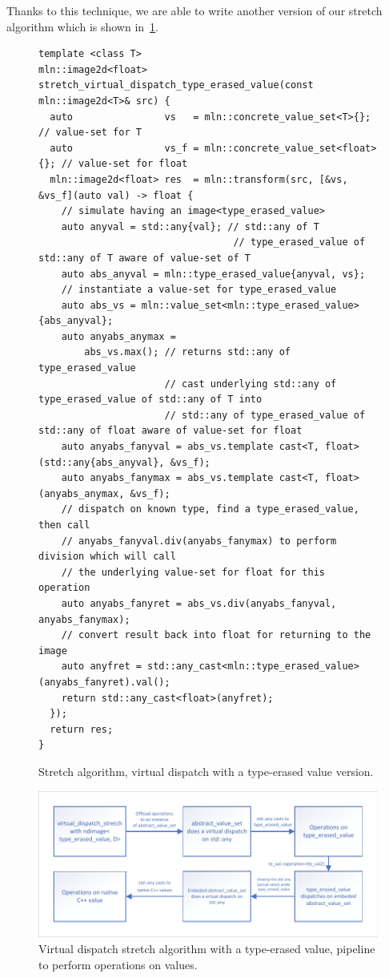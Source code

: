 Thanks to this technique, we are able to write another version of our stretch algorithm which is shown
in~\cref{fig:stretch.virtual.dispatch.type.erased.code}.

\begin{figure}[htbp]
  \begin{verbatim}
template <class T>
mln::image2d<float> stretch_virtual_dispatch_type_erased_value(const mln::image2d<T>& src) {
  auto                vs   = mln::concrete_value_set<T>{};     // value-set for T
  auto                vs_f = mln::concrete_value_set<float>{}; // value-set for float
  mln::image2d<float> res  = mln::transform(src, [&vs, &vs_f](auto val) -> float {
    // simulate having an image<type_erased_value>
    auto anyval = std::any{val}; // std::any of T
                                  // type_erased_value of std::any of T aware of value-set of T
    auto abs_anyval = mln::type_erased_value{anyval, vs};
    // instantiate a value-set for type_erased_value
    auto abs_vs = mln::value_set<mln::type_erased_value>{abs_anyval};
    auto anyabs_anymax =
        abs_vs.max(); // returns std::any of type_erased_value
                      // cast underlying std::any of type_erased_value of std::any of T into
                      // std::any of type_erased_value of std::any of float aware of value-set for float
    auto anyabs_fanyval = abs_vs.template cast<T, float>(std::any{abs_anyval}, &vs_f);
    auto anyabs_fanymax = abs_vs.template cast<T, float>(anyabs_anymax, &vs_f);
    // dispatch on known type, find a type_erased_value, then call
    // anyabs_fanyval.div(anyabs_fanymax) to perform division which will call
    // the underlying value-set for float for this operation
    auto anyabs_fanyret = abs_vs.div(anyabs_fanyval, anyabs_fanymax);
    // convert result back into float for returning to the image
    auto anyfret = std::any_cast<mln::type_erased_value>(anyabs_fanyret).val();
    return std::any_cast<float>(anyfret);
  });
  return res;
}
\end{verbatim}
  \caption{Stretch algorithm, virtual dispatch with a type-erased value version.}
  \label{fig:stretch.virtual.dispatch.type.erased.code}
\end{figure}

\begin{figure}[htbp]
  \centering
  \includegraphics[width=.8\linewidth]{../figures/static_dynamic_bridge/virtual_dispatch_type_erased_value_stretch}
  \caption{Virtual dispatch stretch algorithm with a type-erased value, pipeline to perform operations on values.}
  \label{fig:static_dyn.virtual_dispatch_type_erased_value_stretch}
\end{figure}

